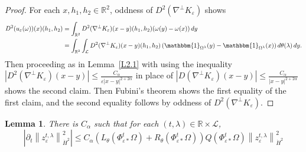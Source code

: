 \documentclass[reqno,centertags,12pt]{amsart}
\newtheorem{lemma}[theorem]{Lemma}
\theoremstyle{definition}
\numberwithin{equation}{section}
\newcommand{\abs}[1]{\left\lvert#1\right\rvert}
\newcommand{\norm}[1]{\left\|#1\right\|}
\newcommand{\bbR}{{\mathbb{R}}}
\newcommand{\eps}{\varepsilon}
\newcommand{\tht}{\theta}
\begin{document}
\begin{proof}
    For each $x,h_{1},h_{2}\in\bbR^{2}$, oddness of $D^{2}(\nabla^{\perp}K_{\eps})$ shows
    \begin{align*}
        D^{2}(u_{\eps}(\omega))(x)(h_{1},h_{2})
        &= \int_{\bbR^{2}}D^{2}(\nabla^{\perp}K_{\eps})(x - y)(h_{1},h_{2})
        (\omega(y) - \omega(x))\,dy \\
        &= \int_{\bbR^{2}}\int_{\mathcal{L}}
        D^{2}(\nabla^{\perp}K_{\eps})(x - y)(h_{1},h_{2})
        \left(\mathbbm{1}_{\Omega^{\lambda}}(y) - \mathbbm{1}_{\Omega^{\lambda}}(x)\right)
        d\theta(\lambda)\,dy.
    \end{align*}
    Then proceeding as in Lemma~\ref{L2.1} with using the inequality
    $\abs{D^{2}(\nabla^{\perp}K_{\eps})(x - y)}
    \leq \frac{C_{\alpha}}{\eps\abs{x - y}^{2+2\alpha}}$
    in place of $\abs{D(\nabla^{\perp}K_{\eps})(x - y)}
    \leq \frac{C_{\alpha}}{\abs{x - y}^{2+2\alpha}}$ shows the second claim.
    Then Fubini's theorem shows the first equality of the first claim,
    and the second equality follows by oddness of $D^{2}(\nabla^{\perp}K_{\eps})$.
\end{proof}

\begin{lemma}\label{L3.7}
    There is $C_{\alpha}$ such that for each $(t,\lambda)\in\bbR\times\mathcal{L}$,
    \begin{equation}\label{3.11}
        \abs{\partial_{t}\norm{z_{\eps}^{t,\lambda}}_{\dot{H}^{2}}^{2}}
        \leq C_{\alpha}(L_{\tht}(\Phi_{\eps*}^{t}\Omega) + R_{\tht}(\Phi_{\eps*}^{t}\Omega))
        Q(\Phi_{\eps*}^{t}\Omega)\norm{z_{\eps}^{t,\lambda}}_{\dot{H}^{2}}^{2}
    \end{equation}
\end{lemma}
\end{document}
